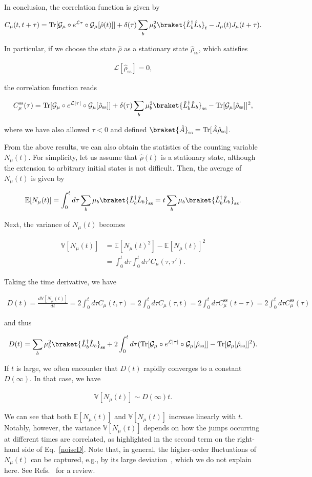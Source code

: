 \documentclass[preprint,pteplogo]{ptephy_v2}%
\numberwithin{equation}{section}
\theoremstyle{definition}
\newcommand{\ml}[1]{\mathcal{#1}}
\newcommand{\mr}[1]{\mathrm{#1}}
\newcommand{\mbb}[1]{\mathbb{#1}}
\newcommand{\aln}[1]{
\begin{align}
#1
\end{align}
}
\newcommand{\Tr}{\mr{Tr}}
\begin{document}
In conclusion, the correlation function is given by
\aln{
C_\mu(t,t+\tau)=\Tr[\ml{G}_\mu\circ e^{\ml{L}\tau}\circ\ml{G}_\mu[\hat{\rho}(t)]]+\delta(\tau)\sum_b\mu_b^2\braket{\hat{L}_b^\dag\hat{L}_b}_t-J_\mu(t)J_\mu(t+\tau).
}
In particular, if we choose the state $\hat{\rho}$ as a stationary state $\hat{\rho}_\mr{ss}$, which satisfies
\aln{
\ml{L}[\hat{\rho}_\mr{ss}]=0,
}
the correlation function reads 
\aln{
C_\mu^\mr{ss}(\tau)=\Tr[\ml{G}_\mu\circ e^{\ml{L}|\tau|}\circ\ml{G}_\mu[\hat{\rho}_\mr{ss}]]+\delta(\tau)\sum_b\mu_b^2\braket{\hat{L}_b^\dag\hat{L}_b}_\mr{ss}-\Tr[\ml{G}_\mu[\hat{\rho}_\mr{ss}]]^2,
}
where we have also allowed $\tau<0$ and defined $\braket{\hat{A}}_\mr{ss}=\Tr[\hat{A}\hat{\rho}_\mr{ss}]$.

From the above results, we can also obtain the statistics of the counting variable $N_\mu(t)$.
For simplicity, let us assume that $\hat{\rho}(t)$ is a stationary state, although the extension to arbitrary initial states is not difficult. Then, the average of $N_\mu(t)$ is given by
\aln{
\mbb{E}[N_\mu(t)]=\int_0^td\tau \sum_b\mu_b\braket{\hat{L}_b^\dag\hat{L}_b}_\mr{ss}=t\sum_b\mu_b\braket{\hat{L}_b^\dag\hat{L}_b}_\mr{ss}.
}
Next, the variance of $N_\mu(t)$ becomes
\aln{
\mbb{V}[N_\mu(t)]&=\mbb{E}[N_\mu(t)^2]-\mbb{E}[N_\mu(t)]^2\nonumber\\
&=\int_0^td\tau\int_0^td\tau' C_\mu(\tau,\tau').
}
Taking the time derivative, we have
\aln{
D(t)=\frac{d\mbb{V}[N_\mu(t)]}{dt}=2\int_0^t d\tau C_\mu(t,\tau)=2\int_0^t d\tau C_\mu(\tau,t)=2\int_0^t d\tau C_\mu^\mr{ss}(t-\tau)=2\int_0^t d\tau C_\mu^\mr{ss}(\tau)
}
and thus
\aln{\label{noiseD}
D(t)=\sum_b\mu_b^2\braket{\hat{L}_b^\dag\hat{L}_b}_\mr{ss}+2\int_0^t d\tau(\Tr[\ml{G}_\mu\circ e^{\ml{L}|\tau|}\circ\ml{G}_\mu[\hat{\rho}_\mr{ss}]]-\Tr[\ml{G}_\mu[\hat{\rho}_\mr{ss}]]^2).
}
If $t$ is large, we often encounter that $D(t)$ rapidly converges to a constant $D(\infty)$. In that case, we have
\aln{
\mbb{V}[N_\mu(t)]\sim D(\infty)t.
}

We can see that both $\mbb{E}[N_\mu(t)]$ and $\mbb{V}[N_\mu(t)]$ increase linearly with $t$.
Notably, however, the variance $\mbb{V}[N_\mu(t)]$ depends on how the jumps occurring at different times are correlated, as highlighted in the second term on the right-hand side of Eq.~\eqref{noiseD}.
Note that, in general, the higher-order fluctuations of $N_\mu(t)$ can be captured, e.g., by its large deviation~\cite{jakvsic2014entropic, van2015sanov}, which we do not explain here. 
See Refs.~\cite{garrahan2018aspects, jack2020ergodicity, landi2024current, touchette2009large} for a review.
\end{document}

